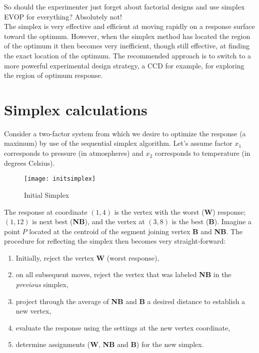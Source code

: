 So should the experimenter just forget about factorial designs and use simplex EVOP for everything?  Absolutely not!\\


The simplex is very effective and efficient at moving rapidly on a response surface toward the optimum.  However, when the simplex method has located the region of the optimum it then becomes very inefficient, though still effective, at finding the exact location of the optimum. The recommended approach is to switch to a more powerful experimental design strategy, a CCD for example, for exploring the region of optimum response.

\section{Simplex calculations}\label{simplex-calc}
Consider a two-factor system from which we desire to optimize the response (a maximum) by use of the sequential simplex algorithm.  Let's assume factor $x_{1}$ corresponds to pressure (in atmospheres)  and $x_{2}$ corresponds to temperature (in degrees Celsius).

\begin{figure}[h]\caption{Initial Simplex}\label{initsimplex}
\begin{center}
\texttt{[image: initsimplex]}
\end{center}
\end{figure}

The response at coordinate $(1,4)$ is the vertex with the worst (\textbf{W}) response; $(1,12)$ is next best (\textbf{NB}), and the vertex at $(3,8)$ is the best (\textbf{B}). Imagine a point $P$ located at the centroid of the segment joining vertex \textbf{B} and \textbf{NB}. The procedure for reflecting the simplex then becomes very straight-forward:

\begin{enumerate}
\item Initially, reject the vertex \textbf{W} (worst response),
\item on all subsequent moves, reject the vertex that was labeled \textbf{NB} in the \textit{previous} simplex,
\item project through the average of \textbf{NB} and \textbf{B} a desired distance to establish a new vertex,
\item evaluate the response using the settings at the new vertex coordinate,
\item determine assignments (\textbf{W}, \textbf{NB} and \textbf{B}) for the new simplex.
\end{enumerate}

